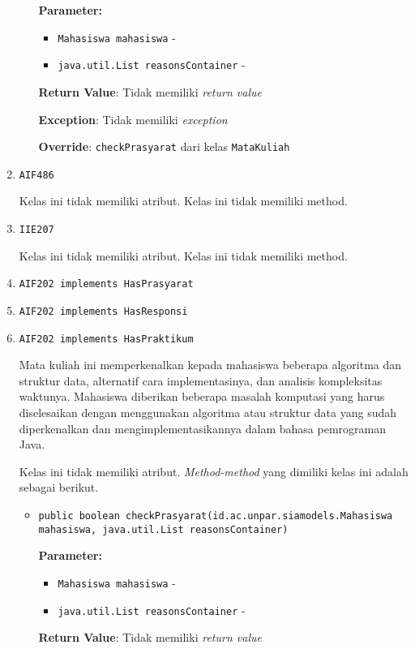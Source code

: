 \documentclass{article}
\begin{document}
\begin{enumerate}
\begin{itemize}
\textbf{Parameter:}
\begin{itemize}
\item \texttt{Mahasiswa mahasiswa} - 
\item \texttt{java.util.List reasonsContainer} - 
\end{itemize}
\textbf{Return Value}: Tidak memiliki \textit{return value}

\textbf{Exception}: Tidak memiliki \textit{exception}

\textbf{Override}: \texttt{checkPrasyarat} dari kelas \texttt{MataKuliah}

\end{itemize}
\item \texttt{AIF486}



Kelas ini tidak memiliki atribut. Kelas ini tidak memiliki method. \item \texttt{IIE207}



Kelas ini tidak memiliki atribut. Kelas ini tidak memiliki method. \item \texttt{AIF202 implements HasPrasyarat}

\item \texttt{AIF202 implements HasResponsi}

\item \texttt{AIF202 implements HasPraktikum}

Mata kuliah ini memperkenalkan kepada mahasiswa beberapa algoritma dan 
 struktur data, alternatif cara implementasinya, dan analisis kompleksitas 
 waktunya. Mahasiswa diberikan beberapa masalah komputasi yang harus 
 diselesaikan dengan menggunakan algoritma atau struktur data yang sudah 
 diperkenalkan dan mengimplementasikannya dalam bahasa pemrograman Java.

Kelas ini tidak memiliki atribut. \textit{Method-method} yang dimiliki kelas ini adalah sebagai berikut.
\begin{itemize}
\item \texttt{public boolean checkPrasyarat(id.ac.unpar.siamodels.Mahasiswa mahasiswa, java.util.List reasonsContainer)}

\textbf{Parameter:}
\begin{itemize}
\item \texttt{Mahasiswa mahasiswa} - 
\item \texttt{java.util.List reasonsContainer} - 
\end{itemize}
\textbf{Return Value}: Tidak memiliki \textit{return value}


\end{itemize}
\end{enumerate}
\end{document}
